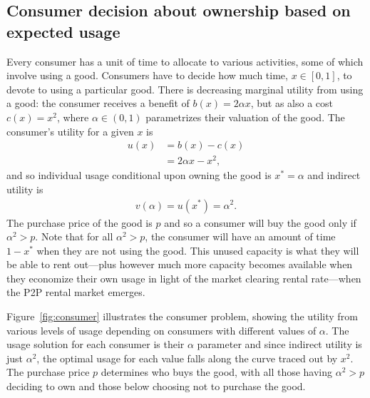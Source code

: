 \documentclass[11pt]{article}
\begin{document}
\subsection{Consumer decision about ownership based on expected usage}  
Every consumer has a unit of time to allocate to various activities, some of which involve using a good.  
Consumers have to decide how much time, $x \in [0,1]$, to devote to using a particular good. 
There is decreasing marginal utility from using a good: 
the consumer receives a benefit of $b(x) = 2\alpha x$, but as also a cost $c(x) = x^2$,  
where $\alpha \in (0,1)$ parametrizes their valuation of the good. 
The consumer's utility for a given $x$ is 
\begin{align}
  u(x) &= b(x) - c(x) \nonumber  \\
       & = 2 \alpha x - x^2,  
\end{align} 
and so individual usage conditional upon owning the good is $x^* = \alpha$ and indirect utility is 
\begin{align}
v(\alpha) = u(x^*) = \alpha^2.  
\end{align} 
The purchase price of the good is $p$ and so a consumer will buy the good only if $\alpha^2 > p$. 
Note that for all $\alpha^2 > p$, the consumer will have an amount of time $1 - x^*$ when they are not using the good.
This unused capacity is what they will be able to rent out---plus however much more capacity becomes available when they economize their own usage in light of the market clearing rental rate---when the P2P rental market emerges. 

Figure~\ref{fig:consumer} illustrates the consumer problem, showing the utility from various levels of usage depending on consumers with different values of $\alpha$.
The usage solution for each consumer is their $\alpha$ parameter and since indirect utility is just $\alpha^2$, the optimal usage for each value falls along the curve traced out by $x^2$.
The purchase price $p$ determines who buys the good, with all those having $\alpha^2 > p$ deciding to own and those below choosing not to purchase the good. 

\pgfmathsetmacro{\xstarOne}{\alphaOne}%
%

\pgfmathsetmacro{\xstarTwo}{\alphaTwo}%
%

\pgfmathsetmacro{\xstarThree}{\alphaThree}%
%
\end{document}
